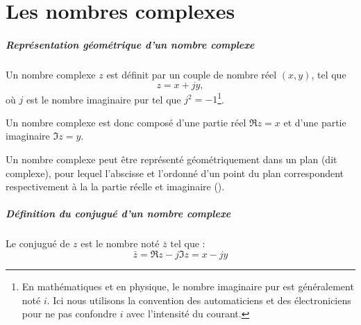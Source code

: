 \chapter{Les nombres complexes\label{annexe-NC}}
\paragraph[Représentation d'un nombre complexe]
          {Représentation géométrique d'un nombre complexe}
Un nombre complexe $z$ est définit par un couple 
de nombre réel $(x,y)$, tel que 
$$
z=x+jy,
$$
où $j$ est le nombre imaginaire pur tel que $j^2=-1$\footnote{En mathématiques 
et en physique, le nombre imaginaire pur est généralement noté $i$. Ici nous 
utilisons la convention des automaticiens et des électroniciens pour ne
pas confondre $i$ avec l'intensité du courant.}.

Un nombre complexe est donc composé d'une partie 
réel $\Re{z}=x$ et d'une partie imaginaire $\Im{z}=y$.

Un nombre complexe peut être représenté géométriquement dans un plan 
(dit complexe), pour lequel l'abscisse et l'ordonné d'un 
point du plan correspondent respectivement 
à la la partie réelle et imaginaire ().
\paragraph{Définition du conjugué d'un nombre complexe}
Le conjugué de $z$ est le nombre noté $\bar{z}$ tel que :
$$
\bar{z}=\Re{z}-j\Im{z}=x-jy
$$

